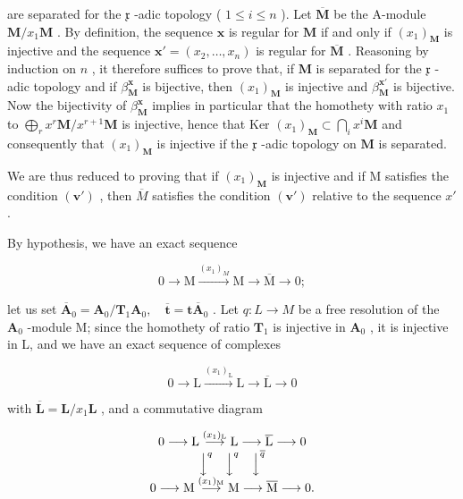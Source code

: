 are separated for the \(\mathfrak{x}\) -adic topology ( \(1 \leqslant i \leqslant n\) ). Let \(\overline{\mathbf{M}}\) be the A-module \(\mathbf{M}/x_1 \mathbf{M}\) . By definition, the sequence \(\mathbf{x}\) is regular for \(\mathbf{M}\) if and only if \((x_1)_\mathbf{M}\) is injective and the sequence \(\mathbf{x}' = (x_2, \ldots, x_n)\) is regular for \(\overline{\mathbf{M}}\) . Reasoning by induction on \(n\) , it therefore suffices to prove that, if \(\mathbf{M}\) is separated for the \(\mathfrak{x}\) -adic topology and if \(\beta_{\mathbf{M}}^{\mathbf{x}}\) is bijective, then \((x_1)_\mathbf{M}\) is injective and \(\beta_{\mathbf{M}}^{\mathbf{x}'}\) is bijective. Now the bijectivity of \(\beta_{\mathbf{M}}^{\mathbf{x}}\) implies in particular that the homothety with ratio \(x_1\) to \(\bigoplus_{r} x^r \mathbf{M}/x^{r+1} \mathbf{M}\) is injective, hence that \(\text{Ker } (x_1)_\mathbf{M} \subset \bigcap_{i} x^i \mathbf{M}\) and consequently that \((x_1)_\mathbf{M}\) is injective if the \(\mathfrak{x}\) -adic topology on \(\mathbf{M}\) is separated.

We are thus reduced to proving that if \((x_{1})_{\mathbf{M}}\) is injective and if M satisfies the condition \((\mathbf{v}')\) , then \(\overline{M}\) satisfies the condition \((\mathbf{v}')\) relative to the sequence \(x'\) .

By hypothesis, we have an exact sequence

\[
0 \longrightarrow \mathrm{M} \xrightarrow {(x _ {1}) _ {M}} \mathrm{M} \longrightarrow \overline {{\mathrm{M}}} \longrightarrow 0;
\]

let us set \(\overline{\mathbf{A}}_{0} = \mathbf{A}_{0}/\mathbf{T}_{1}\mathbf{A}_{0},\quad\overline{\mathbf{t}} = \mathbf{t}\overline{\mathbf{A}}_{0}\) . Let \(q:L\to M\) be a free resolution of the \(\mathbf{A}_{0}\) -module M; since the homothety of ratio \(\mathbf{T}_{1}\) is injective in \(\mathbf{A}_{0}\) , it is injective in L, and we have an exact sequence of complexes

\[
0 \longrightarrow \mathrm{L} \xrightarrow {(x _ {1}) _ {\mathrm{L}}} \mathrm{L} \longrightarrow \overline {{\mathrm{L}}} \longrightarrow 0
\]

with \(\overline{\mathbf{L}} = \mathbf{L} / x_1\mathbf{L}\) , and a commutative diagram

\[
\begin{array}{c} 0 \longrightarrow \mathrm{L} \stackrel {(x _ {1}) _ {\mathrm{L}}} {\longrightarrow} \mathrm{L} \longrightarrow \overline {{\mathrm{L}}} \longrightarrow 0 \\ \Big \downarrow^ {q} \quad \Big \downarrow^ {q} \quad \Big \downarrow^ {\overline {{q}}} \\ 0 \longrightarrow \mathrm{M} \stackrel {(x _ {1}) _ {\mathrm{M}}} {\longrightarrow} \mathrm{M} \longrightarrow \overline {{\mathrm{M}}} \longrightarrow 0. \end{array}
\]

